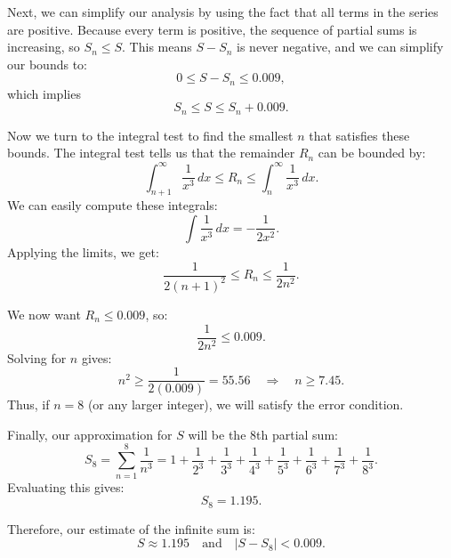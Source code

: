 \documentclass[reqno,14pt]{amsart}
\theoremstyle{plain}
\begin{document}
\medskip

Next, we can simplify our analysis by using the fact that all terms in the series are positive. Because every term is positive, the sequence of partial sums is increasing, so $S_n \le S$. This means $S - S_n$ is never negative, and we can simplify our bounds to:
\[
    0 \le S - S_n \le 0.009,
\]
which implies
\[
    S_n \le S \le S_n + 0.009.
\]

\medskip

Now we turn to the integral test to find the smallest $n$ that satisfies these bounds. The integral test tells us that the remainder $R_n$ can be bounded by:
\[
    \int_{n+1}^\infty \frac{1}{x^3}\,dx \le R_n \le \int_n^\infty \frac{1}{x^3}\,dx.
\]
We can easily compute these integrals:
\[
    \int \frac{1}{x^3}\,dx = -\frac{1}{2x^2}.
\]
Applying the limits, we get:
\[
    \frac{1}{2(n+1)^2} \le R_n \le \frac{1}{2n^2}.
\]

\medskip

We now want $R_n \le 0.009$, so:
\[
    \frac{1}{2n^2} \le 0.009.
\]
Solving for $n$ gives:
\[
    n^2 \ge \frac{1}{2(0.009)} = 55.56 \quad \Rightarrow \quad n \ge 7.45.
\]
Thus, if $n = 8$ (or any larger integer), we will satisfy the error condition.

\medskip

Finally, our approximation for $S$ will be the 8th partial sum:
\[
    S_8 = \sum_{n=1}^8 \frac{1}{n^3} = 1 + \frac{1}{2^3} + \frac{1}{3^3} + \frac{1}{4^3} + \frac{1}{5^3} + \frac{1}{6^3} + \frac{1}{7^3} + \frac{1}{8^3}.
\]
Evaluating this gives:
\[
    S_8 = 1.195.
\]

\medskip

Therefore, our estimate of the infinite sum is:
\[
    S \approx 1.195 \quad \text{and} \quad |S - S_8| < 0.009.
\]
\end{document}
